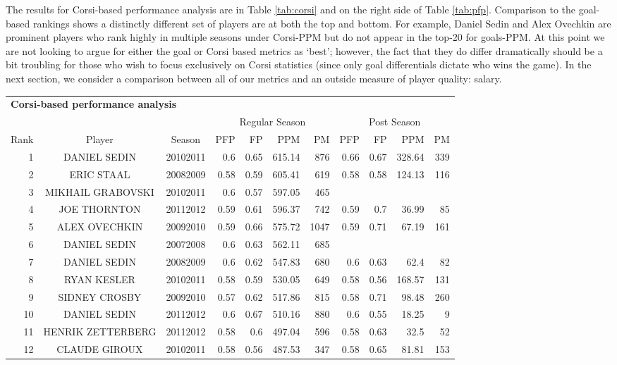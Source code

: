 The results for Corsi-based performance analysis are in Table \ref{tab:corsi}
and on the right side of Table \ref{tab:pfp}.  Comparison to the goal-based
rankings shows a distinctly different set of players are at both the top and
bottom.  For example, Daniel Sedin and Alex Ovechkin are prominent players who
rank highly in multiple seasons under Corsi-PPM but do not appear in the
top-20 for goals-PPM.  At this point we are not looking to argue for either
the goal or Corsi based metrics as `best'; however, the fact that they do
differ dramatically should be a bit troubling for those who wish to focus
exclusively on Corsi statistics (since only goal differentials dictate who
wins the game).  In the next section, we consider a comparison between all of
our metrics and an outside measure of player quality: salary.

\begin{table}[p]
        \centering\small
        \begin{tabular}{r c c | r r r r | r r r r }
        \multicolumn{11}{l}{\bf Corsi-based performance analysis}\\
            & & & \multicolumn{4}{|c}{Regular Season} & \multicolumn{4}{|c}{Post Season}\\
            Rank & Player & Season  & PFP & FP & PPM & PM &PFP & FP & PPM & PM  \\ 
            \hline\rule{0pt}{4ex} 
1&DANIEL SEDIN&20102011&0.6&0.65&615.14&876&0.66&0.67&328.64&339\\
2&ERIC STAAL&20082009&0.58&0.59&605.41&619&0.58&0.58&124.13&116\\
3&MIKHAIL GRABOVSKI&20102011&0.6&0.57&597.05&465&&&&\\
4&JOE THORNTON&20112012&0.59&0.61&596.37&742&0.59&0.7&36.99&85\\
5&ALEX OVECHKIN&20092010&0.59&0.66&575.72&1047&0.59&0.71&67.19&161\\
6&DANIEL SEDIN&20072008&0.6&0.63&562.11&685&&&&\\
7&DANIEL SEDIN&20082009&0.6&0.62&547.83&680&0.6&0.63&62.4&82\\
8&RYAN KESLER&20102011&0.58&0.59&530.05&649&0.58&0.56&168.57&131\\
9&SIDNEY CROSBY&20092010&0.57&0.62&517.86&815&0.58&0.71&98.48&260\\
10&DANIEL SEDIN&20112012&0.6&0.67&510.16&880&0.6&0.55&18.25&9\\
11&HENRIK ZETTERBERG&20112012&0.58&0.6&497.04&596&0.58&0.63&32.5&52\\
12&CLAUDE GIROUX&20102011&0.58&0.56&487.53&347&0.58&0.65&81.81&153\\

\end{tabular}
\end{table}

